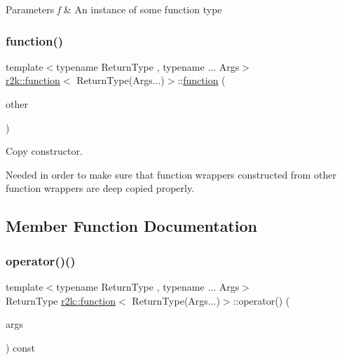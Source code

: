\begin{DoxyParams}{Parameters}
{\em f} & An instance of some function type \\
\hline
\end{DoxyParams}
\mbox{\label{classr2k_1_1function_3_01_return_type_07_args_8_8_8_08_4_ad909b2ac9f0919b36e42d29b57be2fe4}} 
\subsubsection{\texorpdfstring{function()}{function()}\hspace{0.1cm}{\footnotesize\ttfamily [3/3]}}
{\footnotesize\ttfamily template$<$typename Return\+Type , typename ... Args$>$ \\
\mbox{\hyperlink{classr2k_1_1function}{r2k\+::function}}$<$ Return\+Type(Args...)$>$\+::\mbox{\hyperlink{classr2k_1_1function}{function}} (\begin{DoxyParamCaption}\item[{const \mbox{\hyperlink{classr2k_1_1function}{function}}$<$ Return\+Type(Args...)$>$ \&}]{other }\end{DoxyParamCaption})\hspace{0.3cm}{\ttfamily [inline]}}



Copy constructor. 

Needed in order to make sure that function wrappers constructed from other function wrappers are deep copied properly. 

\subsection{Member Function Documentation}
\mbox{\label{classr2k_1_1function_3_01_return_type_07_args_8_8_8_08_4_afe280ba8db5be8a1e1223c20e50ba5bc}} 
\subsubsection{\texorpdfstring{operator()()}{operator()()}}
{\footnotesize\ttfamily template$<$typename Return\+Type , typename ... Args$>$ \\
Return\+Type \mbox{\hyperlink{classr2k_1_1function}{r2k\+::function}}$<$ Return\+Type(Args...)$>$\+::operator() (\begin{DoxyParamCaption}\item[{Args...}]{args }\end{DoxyParamCaption}) const\hspace{0.3cm}{\ttfamily [inline]}}



